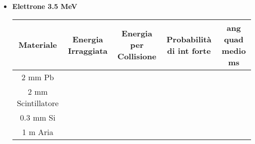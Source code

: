 \documentclass[twoside]{article}
\begin{document}
\begin{itemize}

\item \textbf{Elettrone 3.5 MeV}

\begin{center}
    \begin{tabular}{|c|c|c|c|c|}
    \hline
   Materiale & Energia Irraggiata & Energia per Collisione & Probabilità di int forte & ang quad medio ms \\
    \hline
         2 mm Pb & & & &  \\
          2 mm Scintillatore & & & & \\
           0.3 mm Si & & & & \\
            1 m Aria & & & & \\
            \hline
    \end{tabular}
\end{center}


\end{itemize}
\end{document}
